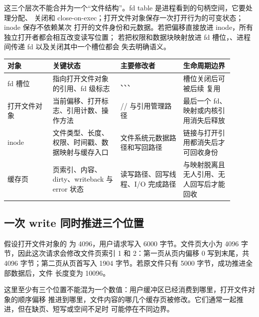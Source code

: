 这三个层次不能合并为一个“文件结构”。fd table 是进程看到的句柄空间，它要处理分配、
关闭和 close-on-exec；打开文件对象保存一次打开行为的可变状态；inode 保存不依赖某次
打开的文件身份和元数据。若把偏移直接放进 inode，所有独立打开者都会相互改变读写位置；
若把权限和数据块映射放进 fd 槽位，、进程间传递 fd 以及关闭其中一个槽位都会
失去明确语义。

\begin{longtable}{|L{0.18\linewidth}|L{0.27\linewidth}|L{0.25\linewidth}|L{0.20\linewidth}|}
\hline
对象 & 关键状态 & 主要修改者 & 生命周期边界 \\ \hline
fd 槽位 & 指向打开文件对象的引用、fd 级标志 & 、、、 & 槽位关闭后可被后续  复用 \\ \hline
打开文件对象 & 当前偏移、打开标志、引用计数、操作方法 & // 与引用管理路径 & 最后一个 fd、映射或内核引用消失后释放 \\ \hline
inode & 文件类型、长度、权限、时间戳、数据映射与缓存入口 & 文件系统元数据路径和写回路径 & 链接与打开引用都消失后才可回收身份 \\ \hline
缓存页 & 页索引、内容、dirty、writeback 与 error 状态 & 读写路径、回写线程、I/O 完成路径 & 与映射脱离且无人引用、无人回写后才能回收 \\ \hline
\end{longtable}

\subsection{一次 write 同时推进三个位置}

假设打开文件对象的  为 4096，用户请求写入 6000 字节。文件页大小为 4096
字节，因此这次请求会修改文件页索引 1 和 2：第一页从页内偏移 0 写到末尾，共 4096
字节；第二页从页首写入 1904 字节。若原文件只有 5000 字节，成功推进全部数据后，文件
长度变为 10096。

这里至少有三个位置不能混为一个数值：用户缓冲区已经消费到哪里，打开文件对象的顺序偏移
推进到哪里，文件内容的哪几个缓存页被修改。它们通常一起推进，但在缺页、短写或空间不足时
可能停在不同边界。

